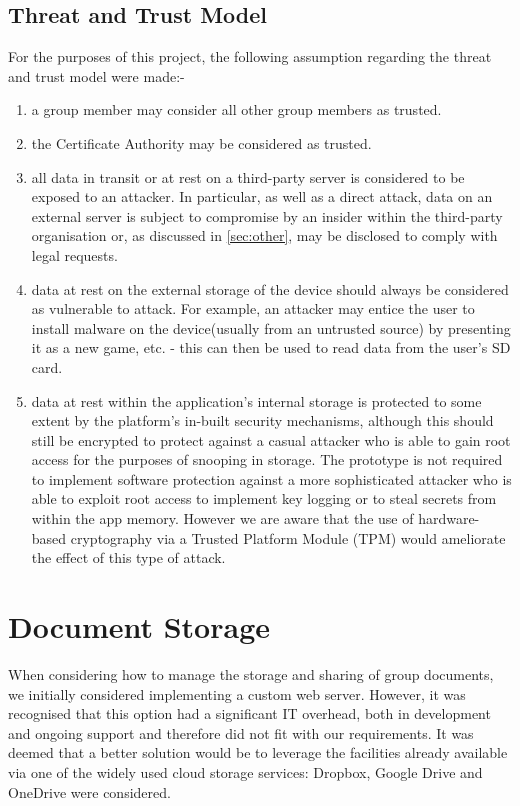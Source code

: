 \subsection*{Threat and Trust Model}
For the purposes of this project, the following assumption regarding the threat and trust model were made:-
\begin{enumerate}[itemsep=3pt]
\item a group member may consider all other group members as trusted.
\item the Certificate Authority may be considered as trusted.  
\item all data in transit or at rest on a third-party server is considered to be exposed to an attacker.  In particular, as well  as a direct attack, data on an external server is subject to compromise by an insider within the third-party organisation or, as discussed in \ref{sec:other}, may be disclosed to comply with legal requests.
\item data at rest on the external storage of the device should always be considered as vulnerable to attack.  For example, an attacker may entice the user to install malware on the device(usually from an untrusted source) by presenting it as a new game, etc. - this can then be used to read data from the user's SD card.
\item  data at rest within the application's internal storage is protected to some extent by the platform's in-built security mechanisms, although this should still be encrypted to protect against a casual attacker who is able to gain root access for the purposes of snooping in storage.  The prototype is not required to implement software protection against a more sophisticated attacker who is able to exploit root access to implement key logging or to steal secrets from within the app memory.  However we are aware that the use of hardware-based cryptography via a Trusted Platform Module (TPM) would ameliorate the effect of this type of attack.
\end{enumerate} 


\section{Document Storage}
When considering how to manage the storage and sharing of group documents, we initially considered implementing a custom web server.  However, it was recognised that this option had a significant IT overhead, both in development and ongoing support and therefore did not fit with our requirements.  It was deemed that a better solution would be to leverage the facilities already available via one of the widely used cloud storage services:  Dropbox, Google Drive and OneDrive were considered.  

